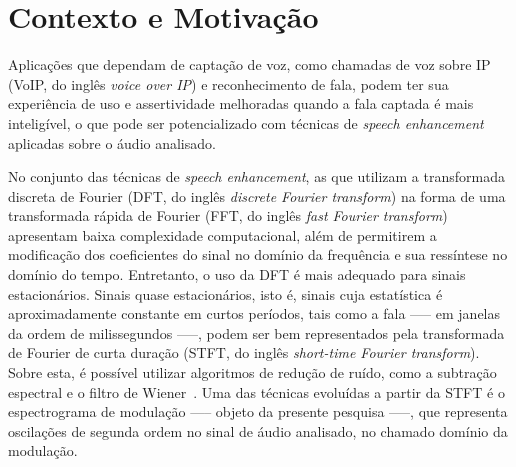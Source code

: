 \section{Contexto e Motivação}

Aplicações que dependam de captação de voz, como chamadas de voz sobre IP (VoIP,
 do inglês \textit{voice over IP}) e reconhecimento de fala, podem ter sua
 experiência de uso e assertividade melhoradas quando a fala captada é mais
 inteligível, o que pode ser potencializado com técnicas de \textit{speech
 enhancement} aplicadas sobre o áudio analisado.

No conjunto das técnicas de \textit{speech enhancement}, as que utilizam a
transformada discreta de Fourier (DFT, do inglês \textit{discrete Fourier
transform}) na forma de uma transformada rápida de Fourier (FFT, do inglês
\textit{fast Fourier transform}) apresentam baixa complexidade computacional,
além de permitirem a modificação dos coeficientes do sinal no domínio da
frequência e sua ressíntese no domínio do tempo. Entretanto, o uso da DFT é mais
adequado para sinais estacionários. Sinais quase estacionários, isto é, sinais
cuja estatística é aproximadamente constante em curtos períodos, tais como a
fala —-- em janelas da ordem de milissegundos —--, podem ser bem representados
pela transformada de Fourier de curta duração (STFT, do inglês
\textit{short-time Fourier transform}). Sobre esta, é possível utilizar
algoritmos de redução de ruído, como a subtração espectral e o filtro de
Wiener~\cite{parchami2016}. Uma das técnicas evoluídas a partir da STFT é o
espectrograma de modulação —-- objeto da presente pesquisa —--, que representa
oscilações de segunda ordem no sinal de áudio analisado, no chamado domínio da
modulação.

